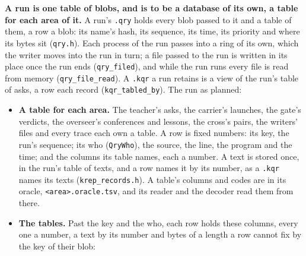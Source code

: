 \textbf{A run is one table of blobs, and is to be a database of its own, a table for each area of it.} A run's \texttt{.\allowbreak{}qry} holds every blob passed to it and a table of them, a row a blob: its name's hash, its sequence, its time, its priority and where its bytes sit (\texttt{qry.\allowbreak{}h}). Each process of the run passes into a ring of its own, which the writer moves into the run in turn; a file passed to the run is written in its place once the run ends (\texttt{qry\_\allowbreak{}filed}), and while the run runs every file is read from memory (\texttt{qry\_\allowbreak{}file\_\allowbreak{}read}). A \texttt{.\allowbreak{}kqr} a run retains is a view of the run's table of asks, a row each record (\texttt{kqr\_\allowbreak{}tabled\_\allowbreak{}by}). The run as planned:

\begin{itemize}
\item \textbf{A table for each area.} The teacher's asks, the carrier's launches, the gate's verdicts, the overseer's conferences and lessons, the cross's pairs, the writers' files and every trace each own a table. A row is fixed numbers: its key, the run's sequence; its who (\texttt{Qry\allowbreak{}Who}), the source, the line, the program and the time; and the columns its table names, each a number. A text is stored once, in the run's table of texts, and a row names it by its number, as a \texttt{.\allowbreak{}kqr} names its texts (\texttt{krep\_\allowbreak{}records.\allowbreak{}h}). A table's columns and codes are in its oracle, \texttt{<area>.\allowbreak{}oracle.\allowbreak{}tsv}, and its reader and the decoder read them from there.
\item \textbf{The tables.} Past the key and the who, each row holds these columns, every one a number, a text by its number and bytes of a length a row cannot fix by the key of their blob:


\end{itemize}
